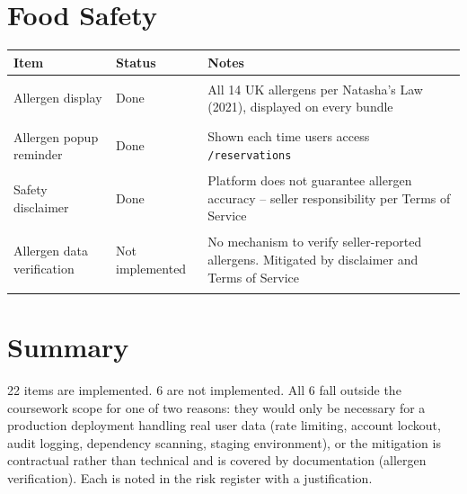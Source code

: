 \documentclass[]{report}
\newcommand{\done}{\colorbox{done}{\strut Done}}
\newcommand{\notimpl}{\colorbox{notdone}{\strut Not implemented}}
\begin{document}
\section*{Food Safety}

\begin{longtable}{|p{4.5cm}|p{2.5cm}|p{7cm}|}
\hline
\textbf{Item} & \textbf{Status} & \textbf{Notes} \\
\hline
Allergen display & \done & All 14 UK allergens per Natasha's Law (2021), displayed on every bundle \\
\hline
Allergen popup reminder & \done & Shown each time users access \texttt{/reservations} \\
\hline
Safety disclaimer & \done & Platform does not guarantee allergen accuracy -- seller responsibility per Terms of Service \\
\hline
Allergen data verification & \notimpl & No mechanism to verify seller-reported allergens. Mitigated by disclaimer and Terms of Service \\
\hline
\end{longtable}

\section*{Summary}

22 items are implemented. 6 are not implemented. All 6 fall outside the coursework scope for one of two reasons: they would only be necessary for a production deployment handling real user data (rate limiting, account lockout, audit logging, dependency scanning, staging environment), or the mitigation is contractual rather than technical and is covered by documentation (allergen verification). Each is noted in the risk register with a justification.
\end{document}
